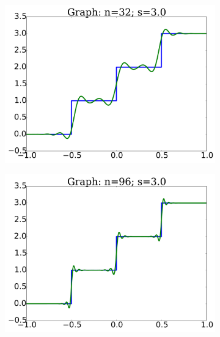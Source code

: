 \begin{figure}[p]
    \begin{subfigure}{0.45\textwidth}
    \includegraphics[width=\textwidth]{plots/graph_n_32_s_3_heaviside_2.pdf}
    \end{subfigure}
    \begin{subfigure}{0.45\textwidth}
    \includegraphics[width=\textwidth]{plots/graph_n_96_s_3_heaviside_2.pdf}
    \end{subfigure}


\end{figure}
